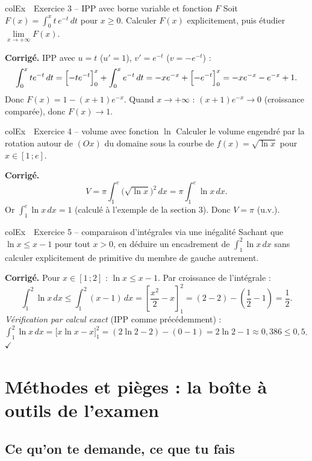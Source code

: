 \documentclass[11pt,a4paper]{article}
\newenvironment{exemple}[1][Exemple]
  {\begin{fiche}{colEx}{\ding{217}~~#1}}{\end{fiche}}
\begin{document}
\begin{exemple}[Exercice 3 -- IPP avec borne variable et fonction $F$]
Soit $F(x)=\displaystyle\int_0^x t\,e^{-t}\,dt$ pour $x\geq0$. Calculer $F(x)$ explicitement, puis étudier $\lim\limits_{x\to+\infty}F(x)$.

\smallskip
\textbf{Corrigé.} IPP avec $u=t$ ($u'=1$), $v'=e^{-t}$ ($v=-e^{-t}$) :
\[
  \int_0^xte^{-t}\,dt = \Bigl[-te^{-t}\Bigr]_0^x+\int_0^xe^{-t}\,dt = -xe^{-x}+\Bigl[-e^{-t}\Bigr]_0^x = -xe^{-x}-e^{-x}+1.
\]
Donc $F(x)=1-(x+1)e^{-x}$. Quand $x\to+\infty$ : $(x+1)e^{-x}\to0$ (croissance comparée), donc $F(x)\to1$.
\end{exemple}

\begin{exemple}[Exercice 4 -- volume avec fonction $\ln$]
Calculer le volume engendré par la rotation autour de $(Ox)$ du domaine sous la courbe de $f(x)=\sqrt{\ln x}$ pour $x\in[1\,;e]$.

\smallskip
\textbf{Corrigé.}
\[
  V = \pi\int_1^e\bigl(\sqrt{\ln x}\bigr)^2\,dx = \pi\int_1^e\ln x\,dx.
\]
Or $\displaystyle\int_1^e\ln x\,dx = 1$ (calculé à l'exemple de la section 3). Donc $V=\pi$ (u.v.).
\end{exemple}

\begin{exemple}[Exercice 5 -- comparaison d'intégrales via une inégalité]
Sachant que $\ln x \leq x-1$ pour tout $x>0$, en déduire un encadrement de $\displaystyle\int_1^2\ln x\,dx$ sans calculer explicitement de primitive du membre de gauche autrement.

\smallskip
\textbf{Corrigé.} Pour $x\in[1\,;2]$ : $\ln x\leq x-1$. Par croissance de l'intégrale :
\[
  \int_1^2\ln x\,dx \leq \int_1^2(x-1)\,dx = \left[\frac{x^2}2-x\right]_1^2 = (2-2)-\left(\frac12-1\right) = \frac12.
\]
\emph{Vérification par calcul exact} (IPP comme précédemment) : $\int_1^2\ln x\,dx = \bigl[x\ln x-x\bigr]_1^2 = (2\ln2-2)-(0-1) = 2\ln2-1\approx0{,}386 \leq0{,}5$. $\checkmark$
\end{exemple}

\section{Méthodes et pièges : la boîte à outils de l'examen}

\subsection{Ce qu'on te demande, ce que tu fais}
\end{document}
